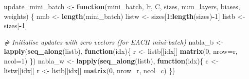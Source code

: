 \documentclass[]{book}
\newenvironment{Shaded}{\begin{snugshade}}{\end{snugshade}}
\newcommand{\CommentTok}[1]{\textcolor[rgb]{0.56,0.35,0.01}{\textit{#1}}}
\newcommand{\ControlFlowTok}[1]{\textcolor[rgb]{0.13,0.29,0.53}{\textbf{#1}}}
\newcommand{\DataTypeTok}[1]{\textcolor[rgb]{0.13,0.29,0.53}{#1}}
\newcommand{\DecValTok}[1]{\textcolor[rgb]{0.00,0.00,0.81}{#1}}
\newcommand{\KeywordTok}[1]{\textcolor[rgb]{0.13,0.29,0.53}{\textbf{#1}}}
\newcommand{\NormalTok}[1]{#1}
\newcommand{\OperatorTok}[1]{\textcolor[rgb]{0.81,0.36,0.00}{\textbf{#1}}}
\newcommand{\StringTok}[1]{\textcolor[rgb]{0.31,0.60,0.02}{#1}}
\begin{document}
\begin{Shaded}
\begin{Highlighting}[]
\NormalTok{update_mini_batch <-}\StringTok{ }\ControlFlowTok{function}\NormalTok{(mini_batch, lr, C, sizes, num_layers, biases, weights)}
\NormalTok{ \{}
\NormalTok{   nmb <-}\StringTok{ }\KeywordTok{length}\NormalTok{(mini_batch)}
\NormalTok{   listw <-}\StringTok{ }\NormalTok{sizes[}\DecValTok{1}\OperatorTok{:}\KeywordTok{length}\NormalTok{(sizes)}\OperatorTok{-}\DecValTok{1}\NormalTok{] }
\NormalTok{   listb <-}\StringTok{  }\NormalTok{sizes[}\OperatorTok{-}\DecValTok{1}\NormalTok{]  }

   \CommentTok{# Initialise updates with zero vectors (for EACH mini-batch)}
\NormalTok{   nabla_b <-}\StringTok{ }\KeywordTok{lapply}\NormalTok{(}\KeywordTok{seq_along}\NormalTok{(listb), }\ControlFlowTok{function}\NormalTok{(idx)\{}
\NormalTok{     r <-}\StringTok{ }\NormalTok{listb[[idx]]}
     \KeywordTok{matrix}\NormalTok{(}\DecValTok{0}\NormalTok{, }\DataTypeTok{nrow=}\NormalTok{r, }\DataTypeTok{ncol=}\DecValTok{1}\NormalTok{)}
\NormalTok{   \})}
\NormalTok{   nabla_w <-}\StringTok{ }\KeywordTok{lapply}\NormalTok{(}\KeywordTok{seq_along}\NormalTok{(listb), }\ControlFlowTok{function}\NormalTok{(idx)\{}
\NormalTok{     c <-}\StringTok{ }\NormalTok{listw[[idx]]}
\NormalTok{     r <-}\StringTok{ }\NormalTok{listb[[idx]]}
     \KeywordTok{matrix}\NormalTok{(}\DecValTok{0}\NormalTok{, }\DataTypeTok{nrow=}\NormalTok{r, }\DataTypeTok{ncol=}\NormalTok{c)}
\NormalTok{   \})  }


\end{Highlighting}
\end{Shaded}
\end{document}
